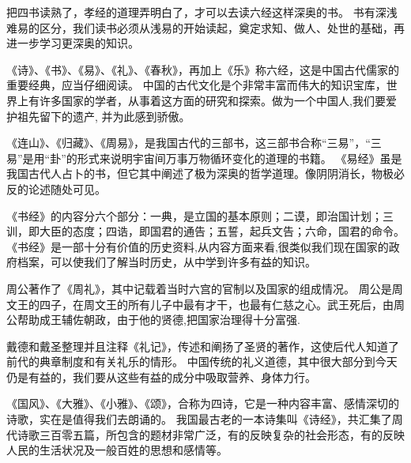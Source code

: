 \documentclass[avery5371,grid]{flashcards}
\begin{document}
{把四书读熟了，孝经的道理弄明白了，才可以去读六经这样深奥的书。} %
{书有深浅难易的区分，我们读书必须从浅易的开始读起，奠定求知、做人、处世的基础，再进一步学习更深奥的知识。} %


{《诗》、《书》、《易》、《礼》、《春秋》，再加上《乐》称六经，这是中国古代儒家的重要经典，应当仔细阅读。} %
{中国的古代文化是个非常丰富而伟大的知识宝库，世界上有许多国家的学者，从事着这方面的研究和探索。做为一个中国人,我们要爱护祖先留下的遗产, 并为此感到骄傲。} %

{《连山》、《归藏》、《周易》，是我国古代的三部书，这三部书合称“三易”，“三易”是用“卦”的形式来说明宇宙间万事万物循环变化的道理的书籍。} %
{《易经》虽是我国古代人占卜的书，但它其中阐述了极为深奥的哲学道理。像阴阴消长，物极必反的论述随处可见。} %

{《书经》的内容分六个部分：一典，是立国的基本原则；二谟，即治国计划；三训，即大臣的态度；四诰，即国君的通告；五誓，起兵文告；六命，国君的命令。} %
{《书经》是一部十分有价值的历史资料,从内容方面来看,很类似我们现在国家的政府档案，可以使我们了解当时历史，从中学到许多有益的知识。} %

{周公著作了《周礼》，其中记载着当时六宫的官制以及国家的组成情况。} %
{周公是周文王的四子，在周文王的所有儿子中最有才干，也最有仁慈之心。武王死后，由周公帮助成王辅佐朝政，由于他的贤德,把国家治理得十分富强.} %

{戴德和戴圣整理并且注释《礼记》，传述和阐扬了圣贤的著作，这使后代人知道了前代的典章制度和有关礼乐的情形。} %
{中国传统的礼义道德，其中很大部分到今天仍是有益的，我们要从这些有益的成分中吸取营养、身体力行。} %

{《国风》、《大雅》、《小雅》、《颂》，合称为四诗，它是一种内容丰富、感情深切的诗歌，实在是值得我们去朗诵的。} %
{我国最古老的一本诗集叫《诗经》，共汇集了周代诗歌三百零五篇，所包含的题材非常广泛，有的反映复杂的社会形态，有的反映人民的生活状况及一般百姓的思想和感情等。} %
\end{document}
